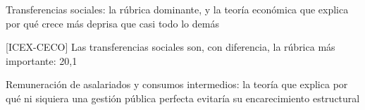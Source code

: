 \documentclass[10pt,a4paper]{article}
\begin{document}
Transferencias sociales: la rúbrica dominante, y la teoría económica que explica por qué crece más deprisa que casi todo lo demás

[ICEX-CECO] Las transferencias sociales son, con diferencia, la rúbrica más importante: 20,1%

Remuneración de asalariados y consumos intermedios: la teoría que explica por qué ni siquiera una gestión pública perfecta evitaría su encarecimiento estructural
\end{document}

